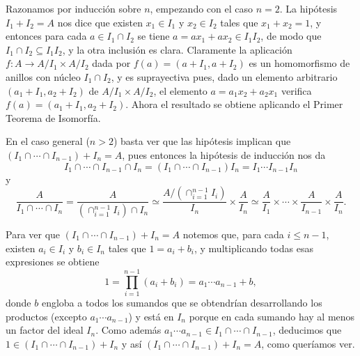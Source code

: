 \begin{proofbox}
Razonamos por inducción sobre $n$, empezando con el caso $n = 2$. La hipótesis $I_1 + I_2 = A$ nos dice que existen $x_1 \in I_1$ y $x_2 \in I_2$ tales que $x_1 + x_2 = 1$, y entonces para cada $a \in I_1 \cap I_2$ se tiene $a = a x_1 + a x_2 \in I_1 I_2$, de modo que $I_1 \cap I_2 \subseteq I_1 I_2$, y la otra inclusión es clara. Claramente la aplicación $f : A \to A/I_1 \times A/I_2$ dada por $f(a) = (a + I_1, a + I_2)$ es un homomorfismo de anillos con núcleo $I_1 \cap I_2$, y es suprayectiva pues, dado un elemento arbitrario $(a_1 + I_1, a_2 + I_2)$ de $A/I_1 \times A/I_2$, el elemento $a = a_1 x_2 + a_2 x_1$ verifica $f(a) = (a_1 + I_1, a_2 + I_2)$. Ahora el resultado se obtiene aplicando el Primer Teorema de Isomorfía.

En el caso general ($n > 2$) basta ver que las hipótesis implican que $(I_1 \cap \cdots \cap I_{n-1}) + I_n = A$, pues entonces la hipótesis de inducción nos da
\[
I_1 \cap \cdots \cap I_{n-1} \cap I_n = (I_1 \cap \cdots \cap I_{n-1}) I_n = I_1 \cdots I_{n-1} I_n
\]
y
\[
\frac{A}{I_1 \cap \cdots \cap I_n} = \frac{A}{(\cap_{i=1}^{n-1} I_i) \cap I_n} \simeq \frac{A/(\cap_{i=1}^{n-1} I_i)}{I_n} \times \frac{A}{I_n} \simeq \frac{A}{I_1} \times \cdots \times \frac{A}{I_{n-1}} \times \frac{A}{I_n}.
\]

Para ver que $(I_1 \cap \cdots \cap I_{n-1}) + I_n = A$ notemos que, para cada $i \leq n-1$, existen $a_i \in I_i$ y $b_i \in I_n$ tales que $1 = a_i + b_i$, y multiplicando todas esas expresiones se obtiene
\[
1 = \prod_{i=1}^{n-1} (a_i + b_i) = a_1 \cdots a_{n-1} + b,
\]
donde $b$ engloba a todos los sumandos que se obtendrían desarrollando los productos (excepto $a_1 \cdots a_{n-1}$) y está en $I_n$ porque en cada sumando hay al menos un factor del ideal $I_n$. Como además $a_1 \cdots a_{n-1} \in I_1 \cap \cdots \cap I_{n-1}$, deducimos que $1 \in (I_1 \cap \cdots \cap I_{n-1}) + I_n$ y así $(I_1 \cap \cdots \cap I_{n-1}) + I_n = A$, como queríamos ver.
\end{proofbox}